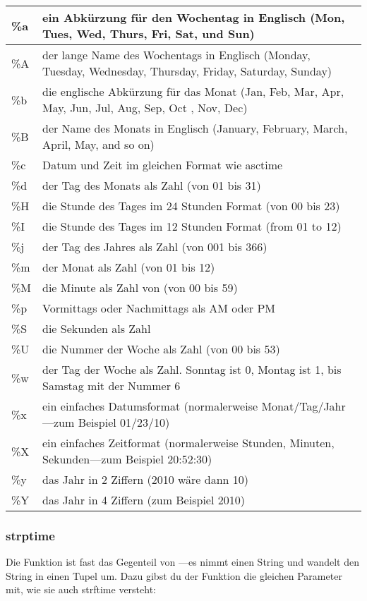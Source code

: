 \begin{center}
\begin{tabular}{|l|p{12cm}|}
\hline
\%a & ein Abkürzung für den Wochentag in Englisch (Mon, Tues, Wed, Thurs, Fri, Sat, und Sun) \\
\hline
\%A & der lange Name des Wochentags in Englisch (Monday, Tuesday, Wednesday, Thursday, Friday, Saturday, Sunday) \\
\hline
\%b & die englische Abkürzung für das Monat (Jan, Feb, Mar, Apr, May, Jun, Jul, Aug, Sep, Oct , Nov, Dec) \\
\hline
\%B & der Name des Monats in Englisch (January, February, March, April, May, and so on) \\
\hline
\%c & Datum und Zeit im gleichen Format wie asctime \\
\hline
\%d & der Tag des Monats als Zahl (von 01 bis 31) \\
\hline
\%H & die Stunde des Tages im 24 Stunden Format (von 00 bis 23) \\
\hline
\%I & die Stunde des Tages im 12 Stunden Format (from 01 to 12) \\
\hline
\%j & der Tag des Jahres als Zahl (von 001 bis 366) \\
\hline
\%m & der Monat als Zahl (von 01 bis 12) \\
\hline
\%M & die Minute als Zahl von (von 00 bis 59) \\
\hline
\%p & Vormittags oder Nachmittags als AM oder PM \\
\hline
\%S & die Sekunden als Zahl \\
\hline
\%U & die Nummer der Woche als Zahl (von 00 bis 53) \\
\hline
\%w & der Tag der Woche als Zahl. Sonntag ist 0, Montag ist 1, bis Samstag mit der Nummer 6 \\
\hline
\%x & ein einfaches Datumsformat (normalerweise Monat/Tag/Jahr---zum Beispiel 01/23/10) \\
\hline
\%X & ein einfaches Zeitformat (normalerweise Stunden, Minuten, Sekunden---zum Beispiel 20:52:30) \\
\hline
\%y & das Jahr in 2 Ziffern (2010 wäre dann 10) \\
\hline
\%Y & das Jahr in 4 Ziffern (zum Beispiel 2010) \\
\hline
\end{tabular}
\end{center}


\subsubsection*{strptime}
Die Funktion  ist fast das Gegenteil von ---es nimmt einen String und wandelt den String in einen Tupel um. Dazu gibst du der Funktion die gleichen Parameter mit, wie sie auch strftime versteht:

